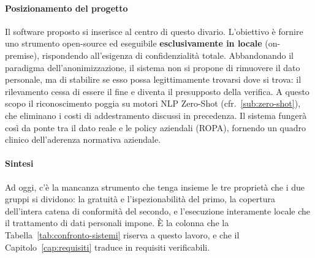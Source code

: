 \paragraph*{Posizionamento del progetto}
Il software proposto si inserisce al centro di questo divario. L'obiettivo è fornire uno strumento open-source ed eseguibile \textbf{esclusivamente in locale} (on-premise), rispondendo all'esigenza di confidenzialità totale. Abbandonando il paradigma dell'anonimizzazione, il sistema non si propone di rimuovere il dato personale, ma di stabilire se esso possa legittimamente trovarsi dove si trova: il rilevamento cessa di essere il fine e diventa il presupposto della verifica. A questo scopo il riconoscimento poggia su motori NLP Zero-Shot (cfr.~\ref{sub:zero-shot}), che eliminano i costi di addestramento discussi in precedenza. Il sistema fungerà così da ponte tra il dato reale e le policy aziendali (ROPA), fornendo un quadro clinico dell'aderenza normativa aziendale.

\paragraph*{Sintesi} Ad oggi, c'è la mancanza strumento che tenga insieme le tre proprietà che i due gruppi si dividono: la gratuità e l'ispezionabilità del primo, la copertura dell'intera catena di conformità del secondo, e l'esecuzione interamente locale che il trattamento di dati personali impone. È la colonna che la Tabella~\ref{tab:confronto-sistemi} riserva a questo lavoro, e che il Capitolo~\ref{cap:requisiti} traduce in requisiti verificabili.
